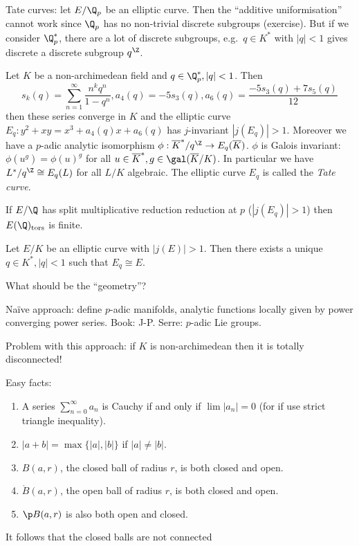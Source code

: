 \documentclass[a4paper]{article}
\begin{document}
Tate curves: let \(E/\Q_p\) be an elliptic curve. Then the ``additive uniformisation'' cannot work since \(\Q_p\) has no non-trivial discrete subgroups (exercise). But if we consider \(\Q_p^*\), there are a lot of discrete subgroups, e.g.\ \(q \in K^*\) with \(|q| < 1\) gives discrete a discrete subgroup \(q^\Z\).

\begin{theorem}[Tate]
  Let \(K\) be a non-archimedean field and \(q \in \Q_p^*, |q| < 1\). Then
  \[
    s_k(q) = \sum_{n = 1}^\infty \frac{n^k q^n}{1 - q^n}, a_4(q) = -5 s_3(q), a_6(q) = \frac{-5s_3(q) + 7s_5(q)}{12}
  \]
  then these series converge in \(K\) and the elliptic curve \(E_q: y^2 + xy = x^3 + a_4(q) x + a_6(q)\) has \(j\)-invariant \(|j(E_q)| > 1\). Moreover we have a \(p\)-adic analytic isomorphism \(\phi: \overline K^*/q^\Z \to E_q(\overline K)\). \(\phi\) is Galois invariant: \(\phi(u^g) = \phi(u)^g\) for all \(u \in \overline K^*, g \in \gal(\overline K/K)\). In particular we have \(L^*/q^\Z \cong E_q(L)\) for all \(L/K\) algebraic. The elliptic curve \(E_q\) is called the \emph{Tate curve}.
\end{theorem}

\begin{ex}
  If \(E/\Q\) has split multiplicative reduction reduction at \(p\) (\(|j(E_q)| > 1\)) then \(E(\Q)_{\operatorname{tors}}\) is finite.
\end{ex}

\begin{theorem}
  Let \(E/K\) be an elliptic curve with \(|j(E)| > 1\). Then there exists a unique \(q \in K^*, |q| < 1\) such that \(E_q \cong E\).
\end{theorem}

What should be the ``geometry''? 

Naïve approach: define \(p\)-adic manifolds, analytic functions locally given by power converging power series. Book: J-P. Serre: \(p\)-adic Lie groups.

Problem with this approach: if \(K\) is non-archimedean then it is totally disconnected!

\begin{ex}
  Easy facts:
  \begin{enumerate}
  \item A series \(\sum_{n = 0}^\infty a_n\) is Cauchy if and only if \(\lim |a_n| = 0\) (for if use strict triangle inequality).
  \item \(|a + b| = \max\{|a|, |b|\}\) if \(|a| \ne |b|\).
  \item \(B(a, r)\), the closed ball of radius \(r\), is both closed and open.
  \item \(\mathring B(a, r)\), the open ball of radius \(r\), is both closed and open.
  \item \(\p B(a, r)\) is also both open and closed.
  \end{enumerate}
  It follows that the closed balls are not connected
\end{ex}
\end{document}
